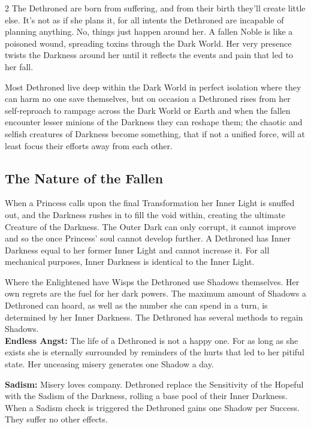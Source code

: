 \begin{multicols}{2}
\noindent The Dethroned are born from suffering, and from their birth they'll create little else. It's not as if she plans it, for all intents the Dethroned are incapable of planning anything. No, things just happen around her. A fallen Noble is like a poisoned wound, spreading toxins through the Dark World. Her very presence twists the Darkness around her until it reflects the events and pain that led to her fall. 

Most Dethroned live deep within the Dark World in perfect isolation where they can harm no one save themselves, but on occasion a Dethroned rises from her self-reproach to rampage across the Dark World or Earth and when the fallen encounter lesser minions of the Darkness they can reshape them; the chaotic and selfish creatures of Darkness become something, that if not a unified force, will at least focus their efforts away from each other. 

\subsection*{The Nature of the Fallen}

When a Princess calls upon the final Transformation her Inner Light is snuffed out, and the Darkness rushes in to fill the void within, creating the ultimate Creature of the Darkness. The Outer Dark can only corrupt, it cannot improve and so the once Princess' soul cannot develop further. A Dethroned has Inner Darkness equal to her former Inner Light and cannot increase it. For all mechanical purposes, Inner Darkness is identical to the Inner Light.

Where the Enlightened have Wisps the Dethroned use Shadows themselves. Her own regrets are the fuel for her dark powers. The maximum amount of Shadows a Dethroned can hoard, as well as the number she can spend in a turn, is determined by her Inner Darkness. The Dethroned has several methods to regain Shadows.\\ 

\noindent \textbf{Endless Angst:} The life of a Dethroned is not a happy one. For as long as she exists she is eternally surrounded by reminders of the hurts that led to her pitiful state. Her unceasing misery generates one Shadow a day.

\noindent \textbf{Sadism:} Misery loves company. Dethroned replace the Sensitivity of the Hopeful with the Sadism of the Darkness, rolling a base pool of their Inner Darkness. When a Sadism check is triggered the Dethroned gains one Shadow per Success. They suffer no other effects.


\end{multicols}
